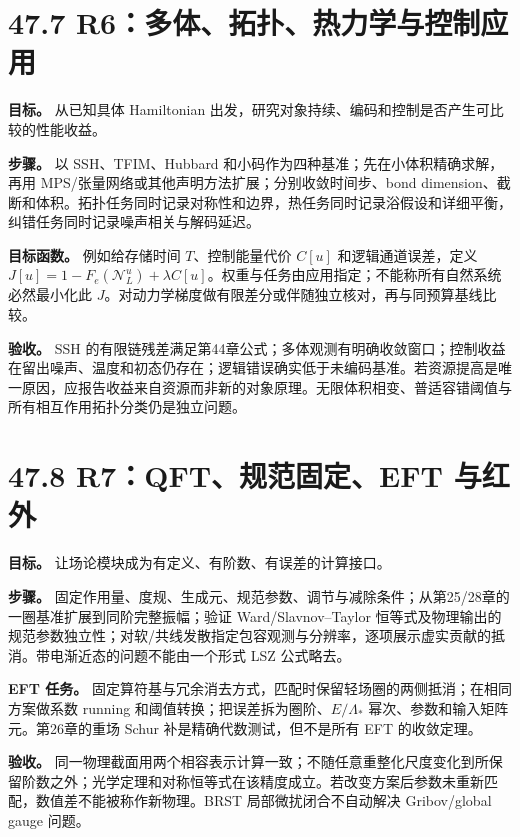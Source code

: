 \documentclass[
  11pt,
  oneside]{book}
\begin{document}
\hypertarget{r6ux591aux4f53ux62d3ux6251ux70edux529bux5b66ux4e0eux63a7ux5236ux5e94ux7528}{%
\section{47.7
R6：多体、拓扑、热力学与控制应用}\label{r6ux591aux4f53ux62d3ux6251ux70edux529bux5b66ux4e0eux63a7ux5236ux5e94ux7528}}

\textbf{目标。} 从已知具体 Hamiltonian
出发，研究对象持续、编码和控制是否产生可比较的性能收益。

\textbf{步骤。} 以 SSH、TFIM、Hubbard
和小码作为四种基准；先在小体积精确求解，再用
MPS/张量网络或其他声明方法扩展；分别收敛时间步、bond
dimension、截断和体积。拓扑任务同时记录对称性和边界，热任务同时记录浴假设和详细平衡，纠错任务同时记录噪声相关与解码延迟。

\textbf{目标函数。} 例如给存储时间 \(T\)、控制能量代价 \(C[u]\)
和逻辑通道误差，定义
\(J[u]=1-F_e(\mathcal N_L^u)+\lambda C[u]\)。权重与任务由应用指定；不能称所有自然系统必然最小化此
\(J\)。对动力学梯度做有限差分或伴随独立核对，再与同预算基线比较。

\textbf{验收。} SSH
的有限链残差满足第44章公式；多体观测有明确收敛窗口；控制收益在留出噪声、温度和初态仍存在；逻辑错误确实低于未编码基准。若资源提高是唯一原因，应报告收益来自资源而非新的对象原理。无限体积相变、普适容错阈值与所有相互作用拓扑分类仍是独立问题。

\hypertarget{r7qftux89c4ux8303ux56faux5b9aeft-ux4e0eux7ea2ux5916}{%
\section{47.8 R7：QFT、规范固定、EFT
与红外}\label{r7qftux89c4ux8303ux56faux5b9aeft-ux4e0eux7ea2ux5916}}

\textbf{目标。} 让场论模块成为有定义、有阶数、有误差的计算接口。

\textbf{步骤。}
固定作用量、度规、生成元、规范参数、调节与减除条件；从第25/28章的一圈基准扩展到同阶完整振幅；验证
Ward/Slavnov--Taylor
恒等式及物理输出的规范参数独立性；对软/共线发散指定包容观测与分辨率，逐项展示虚实贡献的抵消。带电渐近态的问题不能由一个形式
LSZ 公式略去。

\textbf{EFT 任务。}
固定算符基与冗余消去方式，匹配时保留轻场圈的两侧抵消；在相同方案做系数
running 和阈值转换；把误差拆为圈阶、\(E/\Lambda_*\)
幂次、参数和输入矩阵元。第26章的重场 Schur 补是精确代数测试，但不是所有
EFT 的收敛定理。

\textbf{验收。}
同一物理截面用两个相容表示计算一致；不随任意重整化尺度变化到所保留阶数之外；光学定理和对称恒等式在该精度成立。若改变方案后参数未重新匹配，数值差不能被称作新物理。BRST
局部微扰闭合不自动解决 Gribov/global gauge 问题。
\end{document}
